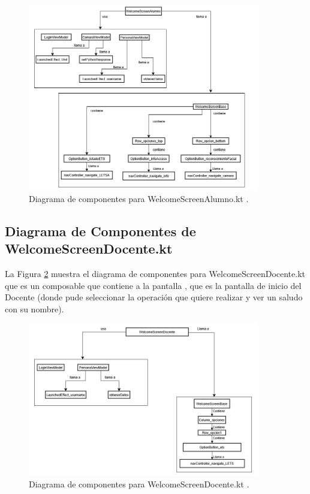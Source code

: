 \begin{figure}[htbp!]
	\begin{center}
		\includegraphics[width=0.9\textwidth]{DiagramasMoviles/DCM (35)}
		\caption{Diagrama de componentes para WelcomeScreenAlumno.kt .}
		\label{fig:Componentes_22}
	\end{center}
\end{figure}

\newpage

\subsection{Diagrama de Componentes de WelcomeScreenDocente.kt}

La Figura \ref{fig:Componentes_23} muestra el diagrama de componentes para WelcomeScreenDocente.kt que es un composable que contiene a la pantalla , que es la pantalla de inicio del Docente (donde pude seleccionar la operación que quiere realizar y ver un saludo con su nombre).

\begin{figure}[htbp!]
	\begin{center}
		\includegraphics[width=0.9\textwidth]{DiagramasMoviles/DCM (36)}
		\caption{Diagrama de componentes para WelcomeScreenDocente.kt .}
		\label{fig:Componentes_23}
	\end{center}
\end{figure}

